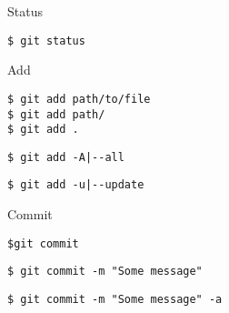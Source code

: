 \documentclass[11pt]{beamer}
\begin{document}
\begin{frame}[fragile]{Status}
    \begin{lstlisting}
$ git status    
    \end{lstlisting}
\end{frame}

\begin{frame}[fragile]{Add}
    \begin{lstlisting}
$ git add path/to/file
$ git add path/
$ git add .
    \end{lstlisting}
    \pause
    \begin{lstlisting}
$ git add -A|--all
    \end{lstlisting}
    \pause
    \begin{lstlisting}
$ git add -u|--update
    \end{lstlisting}
\end{frame}

\begin{frame}[fragile]{Commit}
    \begin{lstlisting}
$git commit
    \end{lstlisting}
    \begin{lstlisting}
$ git commit -m "Some message"
    \end{lstlisting}
    \pause
    \begin{lstlisting}
$ git commit -m "Some message" -a
    \end{lstlisting}
\end{frame}
\end{document}
